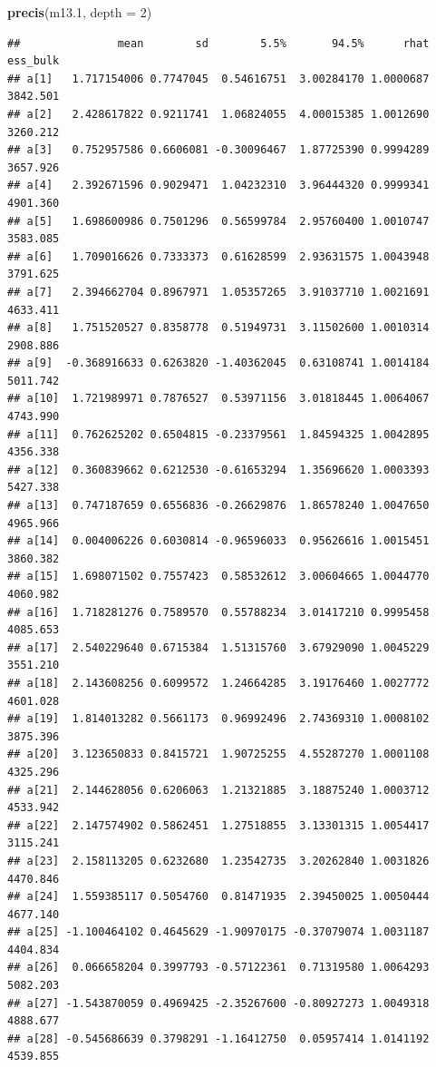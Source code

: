 \documentclass[
]{article}
\newenvironment{Shaded}{\begin{snugshade}}{\end{snugshade}}
\newcommand{\AttributeTok}[1]{\textcolor[rgb]{0.13,0.29,0.53}{#1}}
\newcommand{\DecValTok}[1]{\textcolor[rgb]{0.00,0.00,0.81}{#1}}
\newcommand{\FloatTok}[1]{\textcolor[rgb]{0.00,0.00,0.81}{#1}}
\newcommand{\FunctionTok}[1]{\textcolor[rgb]{0.13,0.29,0.53}{\textbf{#1}}}
\newcommand{\NormalTok}[1]{#1}
\begin{document}
\begin{Shaded}
\begin{Highlighting}[]
\FunctionTok{precis}\NormalTok{(m13}\FloatTok{.1}\NormalTok{, }\AttributeTok{depth =} \DecValTok{2}\NormalTok{)}
\end{Highlighting}
\end{Shaded}

\begin{verbatim}
##               mean        sd        5.5%       94.5%      rhat ess_bulk
## a[1]   1.717154006 0.7747045  0.54616751  3.00284170 1.0000687 3842.501
## a[2]   2.428617822 0.9211741  1.06824055  4.00015385 1.0012690 3260.212
## a[3]   0.752957586 0.6606081 -0.30096467  1.87725390 0.9994289 3657.926
## a[4]   2.392671596 0.9029471  1.04232310  3.96444320 0.9999341 4901.360
## a[5]   1.698600986 0.7501296  0.56599784  2.95760400 1.0010747 3583.085
## a[6]   1.709016626 0.7333373  0.61628599  2.93631575 1.0043948 3791.625
## a[7]   2.394662704 0.8967971  1.05357265  3.91037710 1.0021691 4633.411
## a[8]   1.751520527 0.8358778  0.51949731  3.11502600 1.0010314 2908.886
## a[9]  -0.368916633 0.6263820 -1.40362045  0.63108741 1.0014184 5011.742
## a[10]  1.721989971 0.7876527  0.53971156  3.01818445 1.0064067 4743.990
## a[11]  0.762625202 0.6504815 -0.23379561  1.84594325 1.0042895 4356.338
## a[12]  0.360839662 0.6212530 -0.61653294  1.35696620 1.0003393 5427.338
## a[13]  0.747187659 0.6556836 -0.26629876  1.86578240 1.0047650 4965.966
## a[14]  0.004006226 0.6030814 -0.96596033  0.95626616 1.0015451 3860.382
## a[15]  1.698071502 0.7557423  0.58532612  3.00604665 1.0044770 4060.982
## a[16]  1.718281276 0.7589570  0.55788234  3.01417210 0.9995458 4085.653
## a[17]  2.540229640 0.6715384  1.51315760  3.67929090 1.0045229 3551.210
## a[18]  2.143608256 0.6099572  1.24664285  3.19176460 1.0027772 4601.028
## a[19]  1.814013282 0.5661173  0.96992496  2.74369310 1.0008102 3875.396
## a[20]  3.123650833 0.8415721  1.90725255  4.55287270 1.0001108 4325.296
## a[21]  2.144628056 0.6206063  1.21321885  3.18875240 1.0003712 4533.942
## a[22]  2.147574902 0.5862451  1.27518855  3.13301315 1.0054417 3115.241
## a[23]  2.158113205 0.6232680  1.23542735  3.20262840 1.0031826 4470.846
## a[24]  1.559385117 0.5054760  0.81471935  2.39450025 1.0050444 4677.140
## a[25] -1.100464102 0.4645629 -1.90970175 -0.37079074 1.0031187 4404.834
## a[26]  0.066658204 0.3997793 -0.57122361  0.71319580 1.0064293 5082.203
## a[27] -1.543870059 0.4969425 -2.35267600 -0.80927273 1.0049318 4888.677
## a[28] -0.545686639 0.3798291 -1.16412750  0.05957414 1.0141192 4539.855

\end{verbatim}
\end{document}

